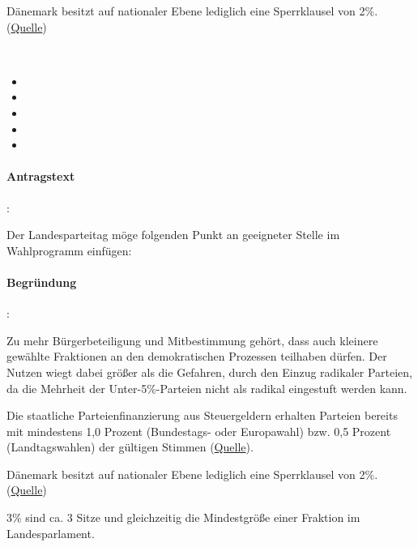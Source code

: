 Dänemark besitzt auf nationaler Ebene lediglich eine Sperrklausel von 2\%. (\href{https://de.wikipedia.org/wiki/Sperrklausel}{Quelle}) 


\label{wpa:prozenthuerde4}
\\
\begin{itemize}
\item {}
\item {}
\item {}
\item {}
\item {}
\end{itemize}

\paragraph{Antragstext}:

Der Landesparteitag möge folgenden Punkt an geeigneter Stelle im Wahlprogramm einfügen:


\paragraph{Begründung}:

Zu mehr Bürgerbeteiligung und Mitbestimmung gehört, dass auch kleinere gewählte Fraktionen an den demokratischen Prozessen teilhaben dürfen. Der Nutzen wiegt dabei größer als die Gefahren, durch den Einzug radikaler Parteien, da die Mehrheit der Unter-5\%-Parteien nicht als radikal eingestuft werden kann.

Die staatliche Parteienfinanzierung aus Steuergeldern erhalten Parteien bereits mit {\Gu}mindestens 1,0 Prozent (Bundestags- oder Europawahl) bzw. 0,5 Prozent (Landtagswahlen) der gültigen Stimmen{\Go} (\href{http://www.bpb.de/themen/513F3I,0,Staatliche_Parteienfinanzierung.html}{Quelle}). 

Dänemark besitzt auf nationaler Ebene lediglich eine Sperrklausel von 2\%. (\href{https://de.wikipedia.org/wiki/Sperrklausel}{Quelle}) 

3\% sind ca. 3 Sitze und gleichzeitig die Mindestgröße einer Fraktion im Landesparlament.

